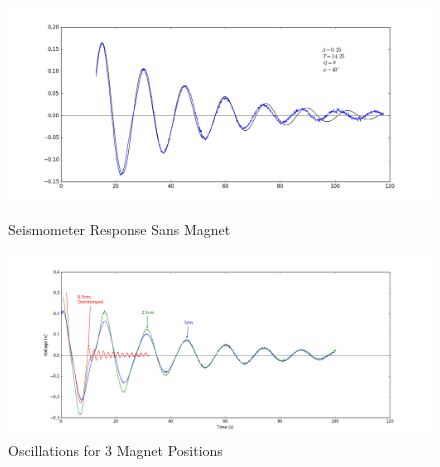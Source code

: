 \documentclass[11pt]{article}   	%
\begin{document}
    \begin{figure}
        \begin{minipage}{0.49\textwidth}
            \centering
            \includegraphics[width=1.1\textwidth]{blowfit.png}
            \caption{Seismometer Response Sans Magnet}
            \label{fig:nomag}
        \end{minipage}
        \begin{minipage}{0.49\textwidth}
            \centering
            \includegraphics[width=1.1\textwidth]{3curvesbest.png}
            \caption{Oscillations for 3 Magnet Positions}
            \label{fig:3curves}
        \end{minipage}
    \end{figure}
\end{document}
